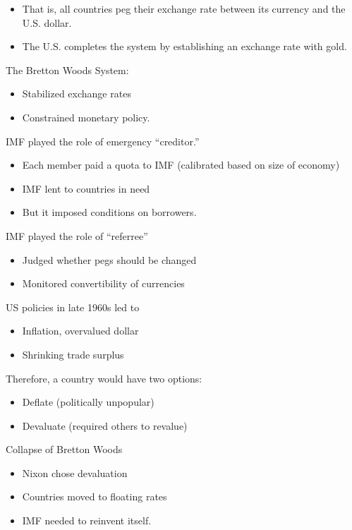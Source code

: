 \documentclass{article}
\begin{document}
\begin{itemize}
  \item That is, all countries peg their exchange rate between its currency and the U.S. dollar.
  \item The U.S. completes the system by establishing an exchange rate with gold.
\end{itemize}

The Bretton Woods System:
\begin{itemize}
  \item Stabilized exchange rates
  \item Constrained monetary policy.
\end{itemize}

IMF played the role of emergency ``creditor.''
\begin{itemize}
  \item Each member paid a quota to IMF (calibrated based on size of economy)
  \item IMF lent to countries in need
  \item But it imposed conditions on borrowers.
\end{itemize}

IMF played the role of ``referree''
\begin{itemize}
  \item Judged whether pegs should be changed
  \item Monitored convertibility of currencies
\end{itemize}

US policies in late 1960s led to
\begin{itemize}
  \item Inflation, overvalued dollar
  \item Shrinking trade surplus
\end{itemize}

Therefore, a country would have two options:
\begin{itemize}
  \item Deflate (politically unpopular)
  \item Devaluate (required others to revalue)
\end{itemize}

Collapse of Bretton Woods
\begin{itemize}
  \item Nixon chose devaluation
  \item Countries moved to floating rates
  \item IMF needed to reinvent itself.
\end{itemize} 
\end{document}
